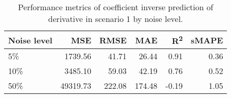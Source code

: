 \begin{table}[H]
  \caption{Performance metrics of coefficient inverse prediction of derivative in scenario 1 by noise level.}\label{table:scenario_1_inv_spectral_metrics}
  \centering
  \begin{tabular}{lrrrrr}
    \toprule
    Noise level & MSE      & RMSE   & MAE    & R\textsuperscript{2}    & sMAPE \\
    \midrule
    5\%         & 1739.56  & 41.71  & 26.44  & 0.91  & 0.36  \\
    10\%        & 3485.10  & 59.03  & 42.19  & 0.76  & 0.52  \\
    50\%        & 49319.73 & 222.08 & 174.48 & -0.19 & 1.05  \\
    \bottomrule
  \end{tabular}
\end{table}

